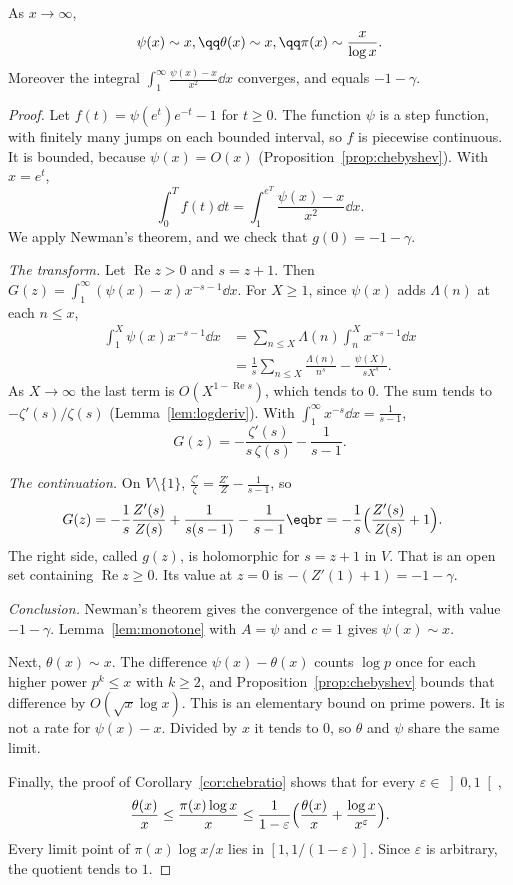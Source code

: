 \begin{theorem}\label{thm:pnt}
As $x\to\infty$,
\[
\begin{gathered}\psi(x)\sim x,\qq\theta(x)\sim x,\qq\pi(x)\sim\frac x{\log x}.\end{gathered}
\]
Moreover the integral $\displaystyle\int_1^\infty\frac{\psi(x)-x}{x^2}\dd x$ converges, and equals $-1-\gamma$.
\end{theorem}
\begin{proof}
Let $f(t)=\psi(e^t)e^{-t}-1$ for $t\ge0$. The function $\psi$ is a step function, with finitely many jumps on each bounded interval, so $f$ is piecewise continuous. It is bounded, because $\psi(x)=O(x)$ (Proposition~\ref{prop:chebyshev}). With $x=e^t$,
\[
\int_0^Tf(t)\dd t=\int_1^{e^T}\frac{\psi(x)-x}{x^2}\dd x.
\]
We apply Newman's theorem, and we check that $g(0)=-1-\gamma$.

\emph{The transform.} Let $\operatorname{Re}z>0$ and $s=z+1$. Then $G(z)=\int_1^\infty(\psi(x)-x)x^{-s-1}\dd x$. For $X\ge1$, since $\psi(x)$ adds $\Lambda(n)$ at each $n\le x$,
\[
\begin{aligned}\int_1^X\psi(x)x^{-s-1}\dd x&=\sum_{n\le X}\Lambda(n)\int_n^Xx^{-s-1}\dd x\\&=\frac1s\sum_{n\le X}\frac{\Lambda(n)}{n^s}-\frac{\psi(X)}{sX^s}.\end{aligned}
\]
As $X\to\infty$ the last term is $O(X^{1-\operatorname{Re}s})$, which tends to $0$. The sum tends to $-\zeta'(s)/\zeta(s)$ (Lemma~\ref{lem:logderiv}). With $\int_1^\infty x^{-s}\dd x=\frac1{s-1}$,
\[
G(z)=-\frac{\zeta'(s)}{s\,\zeta(s)}-\frac1{s-1}.
\]

\emph{The continuation.} On $V\setminus\{1\}$, $\frac{\zeta'}{\zeta}=\frac{Z'}{Z}-\frac1{s-1}$, so
\[
\begin{aligned}G(z)&=-\frac1s\frac{Z'(s)}{Z(s)}+\frac1{s(s-1)}-\frac1{s-1}\eqbr=-\frac1s\Bigl(\frac{Z'(s)}{Z(s)}+1\Bigr).\end{aligned}
\]
The right side, called $g(z)$, is holomorphic for $s=z+1$ in $V$. That is an open set containing $\operatorname{Re}z\ge0$. Its value at $z=0$ is $-(Z'(1)+1)=-1-\gamma$.

\emph{Conclusion.} Newman's theorem gives the convergence of the integral, with value $-1-\gamma$. Lemma~\ref{lem:monotone} with $A=\psi$ and $c=1$ gives $\psi(x)\sim x$.

Next, $\theta(x)\sim x$. The difference $\psi(x)-\theta(x)$ counts $\log p$ once for each higher power $p^k\le x$ with $k\ge2$, and Proposition~\ref{prop:chebyshev} bounds that difference by $O(\sqrt x\log x)$. This is an elementary bound on prime powers. It is not a rate for $\psi(x)-x$. Divided by $x$ it tends to $0$, so $\theta$ and $\psi$ share the same limit.

Finally, the proof of Corollary~\ref{cor:chebratio} shows that for every $\varepsilon\in\left]0,1\right[$,
\[
\frac{\theta(x)}x\le\frac{\pi(x)\log x}x\le\frac1{1-\varepsilon}\Bigl(\frac{\theta(x)}x+\frac{\log x}{x^\varepsilon}\Bigr).
\]
Every limit point of $\pi(x)\log x/x$ lies in $[1,1/(1-\varepsilon)]$. Since $\varepsilon$ is arbitrary, the quotient tends to $1$.
\end{proof}

